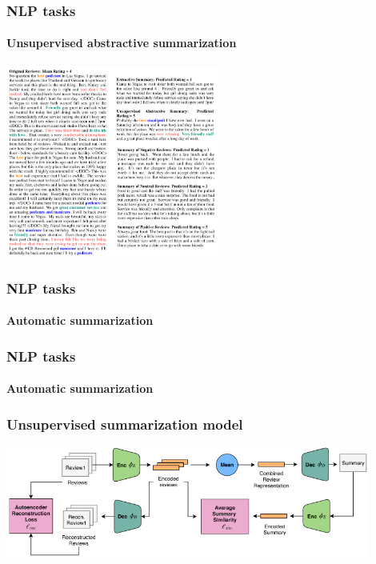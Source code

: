 \documentclass[9pt]{beamer}
\begin{document}
\begin{frame}
  \frametitle{NLP tasks}

  \framesubtitle{Unsupervised abstractive summarization}

  \begin{center}
    \includegraphics[width = 7cm]{images/unsupervised_summarization.png}
  \end{center}
\end{frame}

\begin{frame}
  \frametitle{NLP tasks}

  \framesubtitle{Automatic summarization}
\end{frame}

\begin{frame}
  \frametitle{NLP tasks}

  \framesubtitle{Automatic summarization}
\end{frame}

\appendix

\begin{frame}
  \frametitle{Unsupervised summarization model}

  \begin{center}
    \includegraphics[width = 12cm]{images/unsupervised_summarization_model.png}
  \end{center}
\end{frame}
\end{document}
